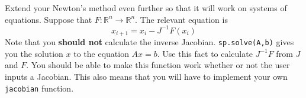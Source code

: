 \begin{problem}
Extend your Newton's method even further so that it will work on systems of equations. Suppose that $F: \mathbb{R}^n \rightarrow \mathbb{R}^n $. The relevant equation is
\[
x_{i+1} = x_i - J^{-1}F(x_i)
\]
Note that you {\bf should not} calculate the inverse Jacobian. {\tt sp.solve(A,b)} gives you the solution $x$ to the equation $Ax=b$. Use this fact to calculate $J^{-1}F$ from $J$ and $F$.  You should be able to make this function work whether or not the user inputs a Jacobian. This also means that you will have to implement your own {\tt jacobian} function.
\end{problem}


